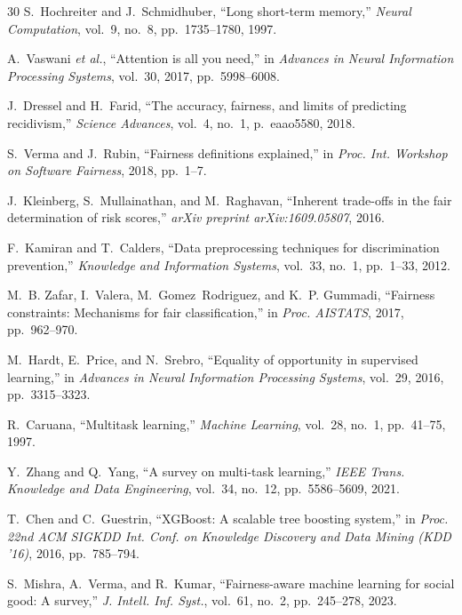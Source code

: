 \documentclass{svproc}
\newcommand{\etal}{\textit{et al.}}
\begin{document}
\begin{thebibliography}{30}
S.~Hochreiter and J.~Schmidhuber, ``Long short-term memory,'' \textit{Neural Computation}, vol.~9, no.~8, pp.~1735--1780, 1997.

A.~Vaswani \etal, ``Attention is all you need,'' in \textit{Advances in Neural Information Processing Systems}, vol.~30, 2017, pp.~5998--6008.

J.~Dressel and H.~Farid, ``The accuracy, fairness, and limits of predicting recidivism,'' \textit{Science Advances}, vol.~4, no.~1, p.~eaao5580, 2018.

S.~Verma and J.~Rubin, ``Fairness definitions explained,'' in \textit{Proc. Int. Workshop on Software Fairness}, 2018, pp.~1--7.

J.~Kleinberg, S.~Mullainathan, and M.~Raghavan, ``Inherent trade-offs in the fair determination of risk scores,'' \textit{arXiv preprint arXiv:1609.05807}, 2016.

F.~Kamiran and T.~Calders, ``Data preprocessing techniques for discrimination prevention,'' \textit{Knowledge and Information Systems}, vol.~33, no.~1, pp.~1--33, 2012.

M.~B. Zafar, I.~Valera, M.~Gomez~Rodriguez, and K.~P. Gummadi, ``Fairness constraints: Mechanisms for fair classification,'' in \textit{Proc. AISTATS}, 2017, pp.~962--970.

M.~Hardt, E.~Price, and N.~Srebro, ``Equality of opportunity in supervised learning,'' in \textit{Advances in Neural Information Processing Systems}, vol.~29, 2016, pp.~3315--3323.

R.~Caruana, ``Multitask learning,'' \textit{Machine Learning}, vol.~28, no.~1, pp.~41--75, 1997.

Y.~Zhang and Q.~Yang, ``A survey on multi-task learning,'' \textit{IEEE Trans. Knowledge and Data Engineering}, vol.~34, no.~12, pp.~5586--5609, 2021.

T.~Chen and C.~Guestrin, ``XGBoost: A scalable tree boosting system,'' in \textit{Proc. 22nd ACM SIGKDD Int. Conf. on Knowledge Discovery and Data Mining (KDD '16)}, 2016, pp.~785--794.

S.~Mishra, A.~Verma, and R.~Kumar, ``Fairness-aware machine learning for social good: A survey,'' \textit{J. Intell. Inf. Syst.}, vol.~61, no.~2, pp.~245--278, 2023.


\end{thebibliography}
\end{document}
